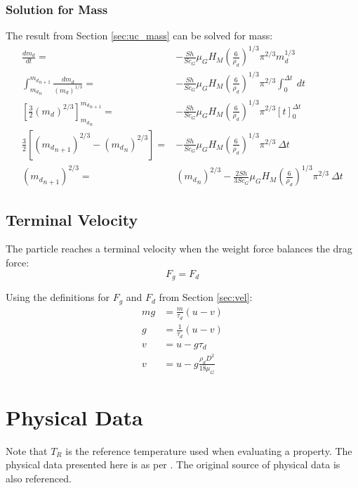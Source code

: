 \documentclass[../Interim_Report_Master]{subfiles}
\begin{document}
\subsubsection{Solution for Mass}\label{sec:mass_sol}
The result from Section \ref{sec:uc_mass} can be solved for mass:
\begin{subequations}
\begin{align}
\frac{dm_d}{dt} =& -\frac{Sh}{Sc_G}\mu_G H_M \left(\frac{6}{\rho_d}\right)^{1/3}\pi^{2/3} m_d^{1/3}\\
\int_{{m_d}_n}^{{m_d}_{n+1}} \frac{dm_d}{\left(m_d\right)^{1/3}} =& -\frac{Sh}{Sc_G}\mu_G H_M \left(\frac{6}{\rho_d}\right)^{1/3}\pi^{2/3}\int_{0}^{\Delta t} ~ dt \\
\left[\frac{3}{2}\left(m_d\right)^{2/3}\right]_{{m_d}_n}^{{m_d}_{n+1}} =& -\frac{Sh}{Sc_G}\mu_G H_M \left(\frac{6}{\rho_d}\right)^{1/3}\pi^{2/3} \left[t\right]_{0}^{\Delta t} \\
\frac{3}{2}\left[\left({m_d}_{n+1}\right)^{2/3} - \left({m_d}_{n}\right)^{2/3}\right] =& -\frac{Sh}{Sc_G}\mu_G H_M \left(\frac{6}{\rho_d}\right)^{1/3}\pi^{2/3} ~ \Delta t \\
\left({m_d}_{n+1}\right)^{2/3} =& \left({m_d}_{n}\right)^{2/3} - \frac{2Sh}{3Sc_G}\mu_G H_M \left(\frac{6}{\rho_d}\right)^{1/3}\pi^{2/3} ~ \Delta t
\end{align}
\end{subequations}

\subsection{Terminal Velocity}\label{sec:term_vel}
The particle reaches a terminal velocity when the weight force balances the drag force:
\begin{equation}
F_g = F_d
\end{equation}

Using the definitions for $F_g$ and $F_d$ from Section \ref{sec:vel}:
\begin{subequations}
\begin{align}
mg &= \frac{m}{\tau_d}(u-v) \\
g &= \frac{1}{\tau_d}(u-v) \\
v &= u - g\tau_d \\
v &= u -g\frac{\rho_d D^2}{18\mu_G}
\end{align}
\end{subequations}

\section{Physical Data}\label{sec:phys_data}
Note that $T_R$ is the reference temperature used when evaluating a property. The physical data presented here is as per \cite{Miller1998}. The original source of physical data is also referenced.
\end{document}
